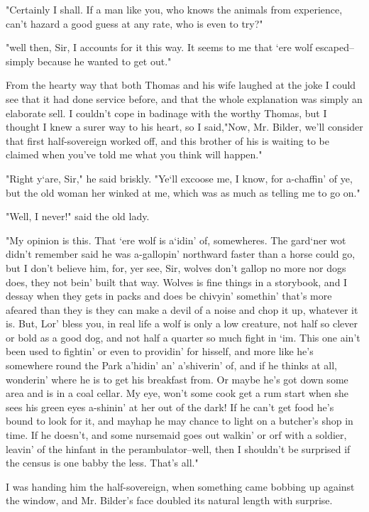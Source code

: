 "Certainly I shall. If a man like you, who knows the animals from experience, can't hazard a good guess at any rate, who is even to try?" 

"well then, Sir, I accounts for it this way. It seems to me that `ere wolf escaped--simply because he wanted to get out." 

From the hearty way that both Thomas and his wife laughed at the joke I could see that it had done service before, and that the whole explanation was simply an elaborate sell. I couldn't cope in badinage with the worthy Thomas, but I thought I knew a surer way to his heart, so I said,"Now, Mr. Bilder, we'll consider that first half-sovereign worked off, and this brother of his is waiting to be claimed when you've told me what you think will happen." 

"Right y`are, Sir," he said briskly. "Ye`ll excoose me, I know, for a-chaffin' of ye, but the old woman her winked at me, which was as much as telling me to go on." 

"Well, I never!" said the old lady. 

"My opinion is this. That `ere wolf is a`idin' of, somewheres. The gard`ner wot didn't remember said he was a-gallopin' northward faster than a horse could go, but I don't believe him, for, yer see, Sir, wolves don't gallop no more nor dogs does, they not bein' built that way. Wolves is fine things in a storybook, and I dessay when they gets in packs and does be chivyin' somethin' that's more afeared than they is they can make a devil of a noise and chop it up, whatever it is. But, Lor' bless you, in real life a wolf is only a low creature, not half so clever or bold as a good dog, and not half a quarter so much fight in `im. This one ain't been used to fightin' or even to providin' for hisself, and more like he's somewhere round the Park a'hidin' an' a'shiverin' of, and if he thinks at all, wonderin' where he is to get his breakfast from. Or maybe he's got down some area and is in a coal cellar. My eye, won't some cook get a rum start when she sees his green eyes a-shinin' at her out of the dark! If he can't get food he's bound to look for it, and mayhap he may chance to light on a butcher's shop in time. If he doesn't, and some nursemaid goes out walkin' or orf with a soldier, leavin' of the hinfant in the perambulator--well, then I shouldn't be surprised if the census is one babby the less. That's all." 

I was handing him the half-sovereign, when something came bobbing up against the window, and Mr. Bilder's face doubled its natural length with surprise. 

